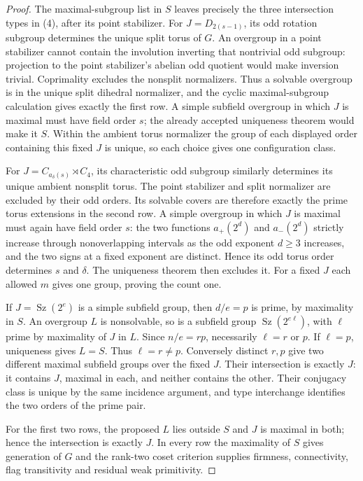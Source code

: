 \documentclass[11pt,a4paper]{article}
\newcommand{\Sz}{\operatorname{Sz}}
\begin{document}
\begin{proof}
The maximal-subgroup list in $S$ leaves precisely the three
intersection types in (4), after its point stabilizer.
For $J=D_{2(s-1)}$, its odd rotation subgroup determines the
unique split torus of $G$. An overgroup in a point stabilizer
cannot contain the involution inverting that nontrivial odd
subgroup: projection to the point stabilizer's abelian odd
quotient would make inversion trivial. Coprimality excludes
the nonsplit normalizers. Thus a solvable overgroup is in the
unique split dihedral normalizer, and the cyclic maximal-subgroup
calculation gives exactly the first row. A simple subfield
overgroup in which $J$ is maximal must have field order $s$;
the already accepted uniqueness theorem would make it $S$.
Within the ambient torus normalizer the group of each displayed
order containing this fixed $J$ is unique, so each choice gives
one configuration class.

For $J=C_{a_\delta(s)}\rtimes C_4$, its characteristic odd
subgroup similarly determines its unique ambient nonsplit
torus. The point stabilizer and split normalizer are excluded
by their odd orders. Its solvable covers are therefore exactly
the prime torus extensions in the second row. A simple overgroup
in which $J$ is maximal must again have field order $s$:
the two functions $a_+(2^d)$ and $a_-(2^d)$ strictly increase
through nonoverlapping intervals as the odd exponent $d\ge3$
increases, and the two signs at a fixed exponent are distinct.
Hence its odd torus order determines $s$ and $\delta$.
The uniqueness theorem then excludes it. For a fixed $J$ each
allowed $m$ gives one group, proving the count one.

If $J=\Sz(2^e)$ is a simple subfield group, then $d/e=p$
is prime, by maximality in $S$. An overgroup $L$ is nonsolvable,
so is a subfield group $\Sz(2^{e\ell})$, with $\ell$ prime
by maximality of $J$ in $L$. Since $n/e=rp$, necessarily
$\ell=r$ or $p$. If $\ell=p$, uniqueness gives $L=S$.
Thus $\ell=r\ne p$. Conversely distinct $r,p$ give two
different maximal subfield groups over the fixed $J$. Their
intersection is exactly $J$: it contains $J$, maximal in each,
and neither contains the other. Their conjugacy class is unique
by the same incidence argument, and type interchange identifies
the two orders of the prime pair.

For the first two rows, the proposed $L$ lies outside $S$ and
$J$ is maximal in both; hence the intersection is exactly $J$.
In every row the maximality of $S$ gives generation of $G$ and
the rank-two coset criterion supplies firmness, connectivity,
flag transitivity and residual weak primitivity.
\end{proof}
\end{document}
